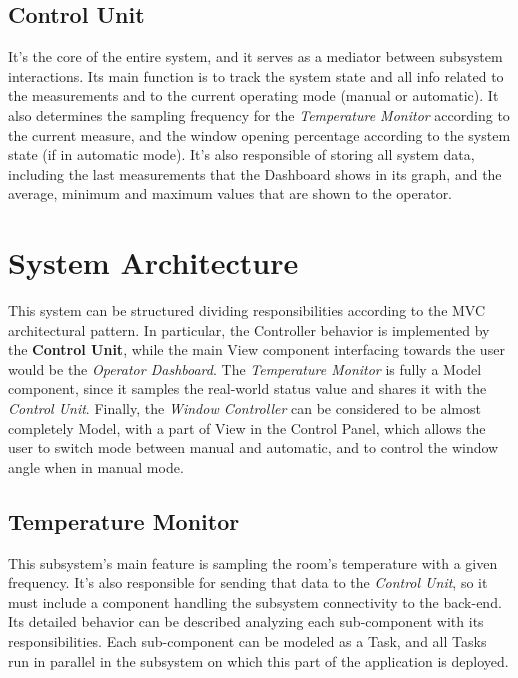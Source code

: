 \documentclass[a4paper,12pt]{report}
\begin{document}
	\section{Control Unit}
	It's the core of the entire system, and it serves as a mediator between subsystem interactions. Its main function is to track the system state and all info related to the measurements and to the current operating mode (manual or automatic). It also determines the sampling frequency for the \textit{Temperature Monitor} according to the current measure, and the window opening percentage according to the system state (if in automatic mode). It's also responsible of storing all system data, including the last measurements that the Dashboard shows in its graph, and the average, minimum and maximum values that are shown to the operator.
	
	\chapter{System Architecture}
	This system can be structured dividing responsibilities according to the MVC architectural pattern.
	\newline In particular, the Controller behavior is implemented by the \textbf{Control Unit}, while the main View component interfacing towards the user would be the \textit{Operator Dashboard}. The \textit{Temperature Monitor} is fully a Model component, since it samples the real-world status value and shares it with the \textit{Control Unit}. Finally, the \textit{Window Controller} can be considered to be almost completely Model, with a part of View in the Control Panel, which allows the user to switch mode between manual and automatic, and to control the window angle when in manual mode.
	\section{Temperature Monitor}
	This subsystem's main feature is sampling the room's temperature with a given frequency. It's also responsible for sending that data to the \textit{Control Unit}, so it must include a component handling the subsystem connectivity to the back-end.
	\newline Its detailed behavior can be described analyzing each sub-component with its responsibilities. Each sub-component can be modeled as a Task, and all Tasks run in parallel in the subsystem on which this part of the application is deployed.
\end{document}
